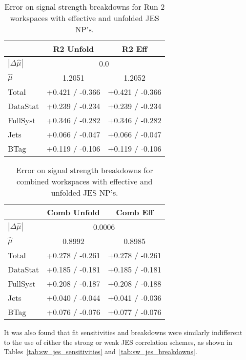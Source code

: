 \begin{table}[!htbp]\captionsetup{justification=centering}
\begin{center}\begin{tabular}{lcc}
\hline\hline
 & R2 Unfold & R2 Eff\\
\hline
$\left|\Delta\hat{\mu}\right|$ &  \multicolumn{2}{c}{0.0}\\
$\hat{\mu}$ & 1.2051 & 1.2052\\
\hline
Total & +0.421 / -0.366  &  +0.421 / -0.366\\
DataStat &  +0.239 / -0.234  &  +0.239 / -0.234\\
FullSyst &  +0.346 / -0.282  &  +0.346 / -0.282\\
\hline
Jets &  +0.066 / -0.047  &  +0.066 / -0.047\\
BTag &  +0.119 / -0.106  &  +0.119 / -0.106\\
\hline
\hline
\end{tabular}
\caption{Error on signal strength breakdowns for Run 2 workspaces with effective and unfolded JES NP's.}
\label{tab:unfold_jes_breakdowns2}
\end{center}
\end{table}


\begin{table}[!htbp]\captionsetup{justification=centering}
\begin{center}\begin{tabular}{lcc}
\hline\hline
 & Comb Unfold & Comb Eff\\
\hline
$\left|\Delta\hat{\mu}\right|$ &  \multicolumn{2}{c}{0.0006}\\
$\hat{\mu}$ & 0.8992 & 0.8985\\
\hline
Total &  +0.278 / -0.261  &  +0.278 / -0.261 \\
DataStat &  +0.185 / -0.181  &  +0.185 / -0.181 \\
FullSyst &  +0.208 / -0.187  &  +0.208 / -0.188 \\
\hline
Jets &  +0.040 / -0.044  &  +0.041 / -0.036 \\
BTag &  +0.076 / -0.076  &  +0.077 / -0.076 \\
\hline
\hline
\end{tabular}
\caption{Error on signal strength breakdowns for combined workspaces with effective and unfolded JES NP's.}
\label{tab:unfold_jes_breakdownsc}
\end{center}
\end{table}

It was also found that fit sensitivities and breakdowns were similarly indifferent to the use of either the strong or weak JES correlation schemes, as shown in Tables~\ref{tab:sw_jes_sensitivities} and~\ref{tab:sw_jes_breakdowns}.


